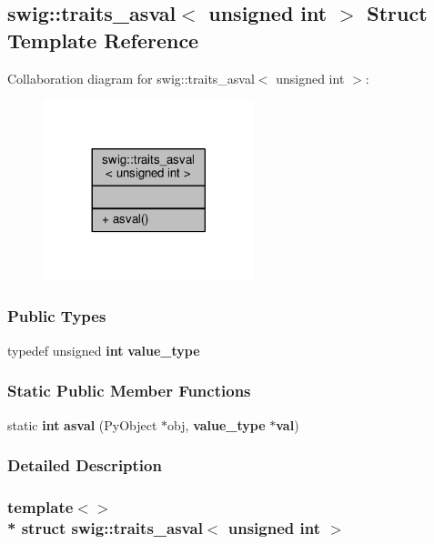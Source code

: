 \subsection{swig\+:\+:traits\+\_\+asval$<$ unsigned int $>$ Struct Template Reference}
\label{structswig_1_1traits__asval_3_01unsigned_01int_01_4}


Collaboration diagram for swig\+:\+:traits\+\_\+asval$<$ unsigned int $>$\+:
\nopagebreak
\begin{figure}[H]
\begin{center}
\leavevmode
\includegraphics[width=173pt]{d1/dcb/structswig_1_1traits__asval_3_01unsigned_01int_01_4__coll__graph}
\end{center}
\end{figure}
\subsubsection*{Public Types}
\begin{DoxyCompactItemize}
\item 
typedef unsigned {\bf int} {\bf value\+\_\+type}
\end{DoxyCompactItemize}
\subsubsection*{Static Public Member Functions}
\begin{DoxyCompactItemize}
\item 
static {\bf int} {\bf asval} (Py\+Object $\ast$obj, {\bf value\+\_\+type} $\ast${\bf val})
\end{DoxyCompactItemize}


\subsubsection{Detailed Description}
\subsubsection*{template$<$$>$\\*
struct swig\+::traits\+\_\+asval$<$ unsigned int $>$}



